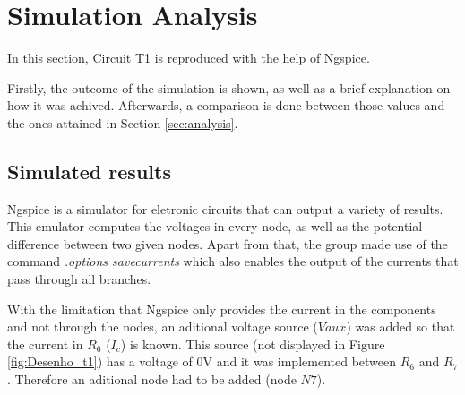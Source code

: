 
\section{Simulation Analysis}
\label{sec:simulation}



In this section, Circuit T1 is reproduced with the help of Ngspice.

Firstly, the outcome of the simulation is shown, as well as a brief explanation
on how it was achived. Afterwards, a comparison is done between those values and
the ones attained in Section \ref{sec:analysis}.




\subsection{Simulated results}
\label{subsec:sim_res}



Ngspice is a simulator for eletronic circuits that can output a variety of results.
This emulator computes the voltages in every node, as well as the potential difference
between two given nodes. Apart from that, the group made use of the command
{\em .options savecurrents} which also enables the output of the currents that pass
through all branches.

With the limitation that Ngspice only provides the current in the components and not through
the nodes, an aditional voltage source ($Vaux$) was added so that the current in $R_6$ ($I_c$)
is known. This source (not displayed in Figure \ref{fig:Desenho_t1}) has a voltage of 0V and it 
was implemented between $R_6$ and $R_7$. Therefore an aditional node had to be added (node $N7$).

